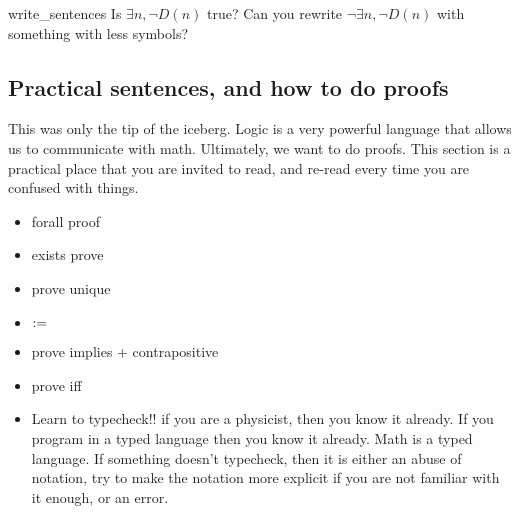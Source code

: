 \begin{cex}{}{write_sentences}
    Is \( \exists n, \neg D(n) \) true? Can you rewrite \( \neg \exists n, \neg D(n) \) with something with less symbols?
\end{cex}


\subsection{Practical sentences, and how to do proofs}

This was only the tip of the iceberg. Logic is a very powerful language that allows us to communicate with math. Ultimately, we want to do proofs. This section is a practical place that you are invited to read, and re-read every time you are confused with things. 


\begin{itemize}
    \item forall proof
    \item exists prove
    \item prove unique
    \item \( := \)
    \item prove implies + contrapositive
    \item prove iff 
    \item Learn to typecheck!! if you are a physicist, then you know it already. If you program in a typed language then you know it already. Math is a typed language. If something doesn't typecheck, then it is either an abuse of notation, try to make the notation more explicit if you are not familiar with it enough, or an error.
\end{itemize}